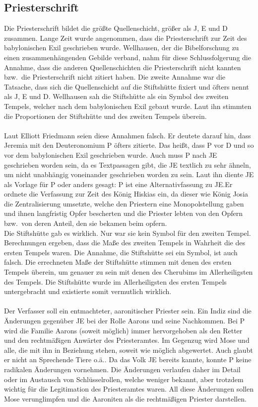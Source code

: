 \subsection*{Priesterschrift}
Die Priesterschrift bildet die größte Quellenschicht, größer als J, E und D zusammen. Lange Zeit wurde angenommen, dass die Priesterschrift zur Zeit des babylonischen Exil geschrieben wurde. Wellhausen, der die Bibelforschung zu einen zusammenhängenden Gebilde verband, nahm für diese Schlussfolgerung die Annahme, dass die anderen Quellenschichten die Priesterschrift nicht kannten bzw.\ die Priesterschrift nicht zitiert haben. Die zweite Annahme war die Tatsache, dass sich die Quellenschicht auf die Stiftshütte fixiert und öfters nennt als J, E und D. Wellhausen sah die Stiftshütte als ein Symbol des zweiten Tempels, welcher nach dem babylonischen Exil gebaut wurde. Laut ihn stimmten die Proportionen der Stiftshütte und des zweiten Tempels überein.
\\~\\
Laut Elliott Friedmann seien diese Annahmen falsch. Er deutete darauf hin, dass Jeremia mit den Deuteronomium P öfters zitierte. Das heißt, dass P vor D und so vor dem babylonischen Exil geschrieben wurde. Auch muss P nach JE geschrieben worden sein, da es Textpassagen gibt, die JE textlich zu sehr ähneln, um nicht unabhängig voneinander geschrieben worden zu sein. Laut ihn diente JE als Vorlage für P oder anders gesagt: P ist eine Alternativfassung zu JE.\@ Er ordnete die Verfassung zur Zeit des König Hiskias ein, da dieser wie König Josia die Zentralisierung umsetzte, welche den Priestern eine Monopolstellung gaben und ihnen langfristig Opfer bescherten und die Priester lebten von den Opfern bzw.\ von deren Anteil, den sie bekamen beim opfern.
\\
Die Stiftshütte gab es wirklich. Nur war sie kein Symbol für den zweiten Tempel. Berechnungen ergeben, dass die Maße des zweiten Tempels in Wahrheit die des ersten Tempels waren. Die Annahme, die Stiftshütte sei ein Symbol, ist auch falsch. Die errechneten Maße der Stiftshütte stimmen mit denen des ersten Tempels überein, um genauer zu sein mit denen des Cherubims im Allerheiligsten des Tempels.
Die Stiftshütte wurde im Allerheiligsten des ersten Tempels untergebracht und existierte somit vermutlich wirklich.
\\~\\
Der Verfasser soll ein entmachteter, aaronitischer Priester sein. Ein Indiz sind die Änderungen gegenüber JE  bei der Rolle Aarons und seine Nachkommen. Bei P wird die Familie Aarons (soweit möglich) immer hervorgehoben als den Retter und den rechtmäßigen Anwärter des Priesteramtes. Im Gegenzug wird Mose und alle, die mit ihn in Beziehung stehen, soweit wie möglich abgewertet. Auch glaubt er nicht an Sprechende Tiere o.ä.. Da das Volk JE bereits kannte, konnte P keine radikalen Änderungen vornehmen. Die Änderungen verlaufen daher im Detail oder im Austausch von Schlüsselrollen, welche weniger bekannt, aber trotzdem wichtig für die Legitimation des Priesteramtes waren. All diese Änderungen sollen Mose verunglimpfen und die Aaroniten als die rechtmäßigen Priester darstellen.

